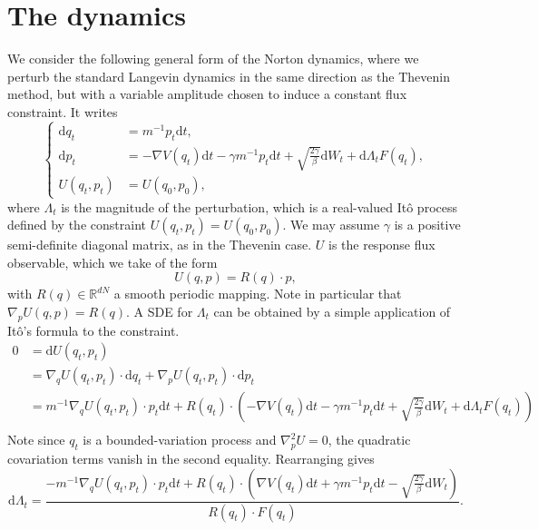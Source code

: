 \documentclass[a4paper,10pt,twoside,leqno]{report}
\newcommand{\R}{\mathbb{R}}
\newcommand{\dif}{\mathrm{d}}
\newcommand{\1}{\mathbbm{1}}
\begin{document}
    \section{The dynamics}
    We consider the following general form of the Norton dynamics, where we perturb the standard Langevin dynamics in the same direction as the Thevenin method, but with a variable amplitude chosen to induce a constant flux constraint.
    It writes
    \begin{equation}
        \label{eq:norton_sv_dynamics_alt}
        \left\{ 
            \begin{aligned}
                \dif q_t&=m^{-1}p_t\dif t,\\
                \dif p_t&=-\nabla V(q_t)\dif t-\gamma m^{-1}p_t\dif t +\sqrt{\frac{2\gamma}\beta}\dif W_t +\dif \Lambda_t F(q_t),\\
                U(q_t,p_t)&=U(q_0,p_0),
            \end{aligned}
        \right.
    \end{equation}
    where $\Lambda_t$ is the magnitude of the perturbation, which is a real-valued Itô process defined by the constraint $U(q_t,p_t)=U(q_0,p_0)$.
    We may assume $\gamma$ is a positive semi-definite diagonal matrix, as in the Thevenin case. $U$ is the response flux observable, which we take of the form
    \[U(q,p)=R(q)\cdot p,\]
    with $R(q)\in \R^{dN}$ a smooth periodic mapping. Note in particular that $\nabla_p U(q,p)=R(q)$.
    A SDE for $\Lambda_t$ can be obtained by a simple application of Itô's formula to the constraint.
    \begin{align*}
        0&=\dif U(q_t,p_t)\\
        &=\nabla_q U(q_t,p_t)\cdot \dif q_t+\nabla_p U(q_t,p_t)\cdot \dif p_t\\
        &=m^{-1}\nabla_q U(q_t,p_t) \cdot p_t \dif t + R(q_t)\cdot \left(-\nabla V(q_t)\dif t-\gamma m^{-1}p_t\dif t +\sqrt{\frac{2\gamma}\beta}\dif W_t +\dif \Lambda_t F(q_t)\right)\\
    \end{align*}
    Note since $q_t$ is a bounded-variation process and $\nabla^2_p U=0$, the quadratic covariation terms vanish in the second equality. Rearranging gives 
    \begin{equation}
        \label{eq:norton_sv_forcing_sde}
        \dif\Lambda_t = \frac{-m^{-1}\nabla_q U(q_t,p_t)\cdot p_t \dif t+R(q_t)\cdot\left(\nabla V(q_t)\dif t+\gamma m^{-1}p_t\dif t-\sqrt{\frac{2\gamma}\beta}\dif W_t \right)}{R(q_t)\cdot F(q_t)}.
    \end{equation}
\end{document}
